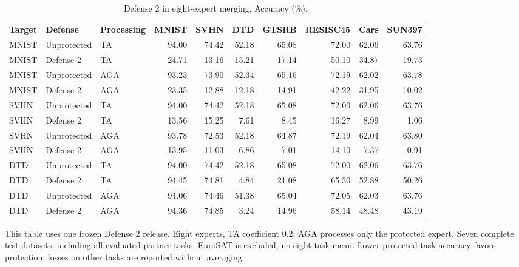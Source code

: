 \begin{table}[t]
\centering\small
\setlength{\tabcolsep}{4pt}
\caption{Defense 2 in eight-expert merging. Accuracy (\%).}
\label{tab:defense2_eight_versions}
\begin{tabular}{@{}lllrrrrrrr@{}}
\toprule
Target & Defense & Processing & MNIST & SVHN & DTD & GTSRB & RESISC45 & Cars & SUN397 \\
\midrule
MNIST & Unprotected & TA & 94.00 & 74.42 & 52.18 & 65.08 & 72.00 & 62.06 & 63.76 \\
MNIST & Defense 2 & TA & 24.71 & 13.16 & 15.21 & 17.14 & 50.10 & 34.87 & 19.73 \\
MNIST & Unprotected & AGA & 93.23 & 73.90 & 52.34 & 65.16 & 72.19 & 62.02 & 63.78 \\
MNIST & Defense 2 & AGA & 23.35 & 12.88 & 12.18 & 14.91 & 42.22 & 31.95 & 10.02 \\
\midrule
SVHN & Unprotected & TA & 94.00 & 74.42 & 52.18 & 65.08 & 72.00 & 62.06 & 63.76 \\
SVHN & Defense 2 & TA & 13.56 & 15.25 & 7.61 & 8.45 & 16.27 & 8.99 & 1.06 \\
SVHN & Unprotected & AGA & 93.78 & 72.53 & 52.18 & 64.87 & 72.19 & 62.04 & 63.80 \\
SVHN & Defense 2 & AGA & 13.95 & 11.03 & 6.86 & 7.01 & 14.10 & 7.37 & 0.91 \\
\midrule
DTD & Unprotected & TA & 94.00 & 74.42 & 52.18 & 65.08 & 72.00 & 62.06 & 63.76 \\
DTD & Defense 2 & TA & 94.45 & 74.81 & 4.84 & 21.08 & 65.30 & 52.88 & 50.26 \\
DTD & Unprotected & AGA & 94.06 & 74.46 & 51.38 & 65.04 & 72.05 & 62.03 & 63.76 \\
DTD & Defense 2 & AGA & 94.36 & 74.85 & 3.24 & 14.96 & 58.14 & 48.48 & 43.19 \\
\bottomrule
\end{tabular}
\par\smallskip
\begin{minipage}{\textwidth}\footnotesize This table uses one frozen Defense 2 release. Eight experts, TA coefficient 0.2; AGA processes only the protected expert. Seven complete test datasets, including all evaluated partner tasks. EuroSAT is excluded; no eight-task mean. Lower protected-task accuracy favors protection; losses on other tasks are reported without averaging.\end{minipage}
\end{table}

